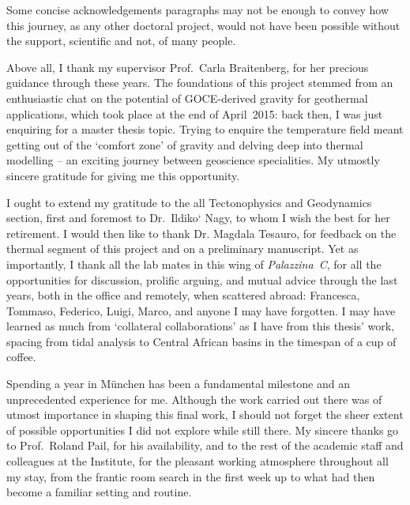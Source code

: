 \vspace{-1.65cm}
\begin{flushright}
\end{flushright}

\noindent Some concise acknowledgements paragraphs may not be enough to convey how this journey, as any other doctoral project, would not have been possible without the support, scientific and not, of many people.

Above all, I thank my supervisor Prof.~Carla Braitenberg, for her precious guidance through these years.
The foundations of this project stemmed from an enthusiastic chat on the potential of GOCE-derived gravity for geothermal applications, which took place at the end of April~2015: back then, I was just enquiring for a master thesis topic.
Trying to enquire the temperature field meant getting out of the `comfort zone' of gravity and delving deep into thermal modelling -- an exciting journey between geoscience specialities.
My utmostly sincere gratitude for giving me this opportunity.

I ought to extend my gratitude to the all Tectonophysics and Geodynamics section, first and foremost to Dr.~Ildiko‘ Nagy, to whom I wish the best for her retirement.
I would then like to thank Dr. Magdala Tesauro, for feedback on the thermal segment of this project and on a preliminary manuscript.
Yet as importantly, I thank all the lab mates in this wing of \textit{Palazzina~C}, for all the opportunities for discussion, prolific arguing, and mutual advice through the last years, both in the office and remotely, when scattered abroad: Francesca, Tommaso, Federico, Luigi, Marco, and anyone I may have forgotten.
I may have learned as much from `collateral collaborations' as I have from this thesis' work, spacing from tidal analysis to Central African basins in the timespan of a cup of coffee.

\bigskip

Spending a year in München has been a fundamental milestone and an unprecedented experience for me.
Although the work carried out there was of utmost importance in shaping this final work, I should not forget the sheer extent of possible opportunities I did not explore while still there.
My sincere thanks go to Prof.~Roland Pail, for his availability, and to the rest of the academic staff and colleagues at the Institute, for the pleasant working atmosphere throughout all my stay, from the frantic room search in the first week up to what had then become a familiar setting and routine.

